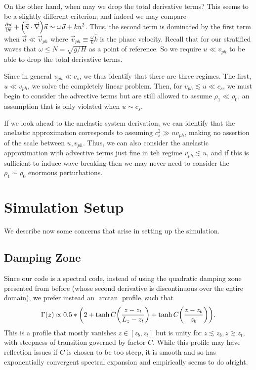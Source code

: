 \documentclass[11pt,
        usenames, %
        dvipsnames %
    ]{report}
\newcommand*{\pd}[2]{\frac{\partial#1}{\partial#2}}
\DeclarePairedDelimiter\p{\lparen}{\rparen}
\begin{document}
On the other hand, when may we drop the total derivative terms? This seems to be
a slightly different criterion, and indeed we may compare $\pd{\vec{u}}{t} +
\p*{\vec{u} \cdot \vec{\nabla}} \vec{u} \sim \omega \vec{u} + ku^2$. Thus, the
second term is dominated by the first term when $\vec{u} \ll \vec{v}_{ph}$ where
$\vec{v}_{ph} \equiv \frac{\omega}{k}\hat{k}$ is the phase velocity. Recall that
for our stratified waves that $\omega \leq N = \sqrt{g/H}$ as a point of
reference. So we require $u \ll v_{ph}$ to be able to drop the total derivative
terms.

Since in general $v_{ph} \ll c_s$, we thus identify that there are three
regimes. The first, $u \ll v_{ph}$, we solve the completely linear problem.
Then, for $v_{ph} \lesssim u \ll c_s$, we must begin to consider the advective
terms but are still allowed to assume $\rho_1 \ll \rho_0$, an assumption that is
only violated when $u \sim c_s$.

If we look ahead to the anelastic system derivation, we can identify that the
anelastic approximation corresponds to assuming $c_s^2 \gg uv_{ph}$, making no
assertion of the scale between $u, v_{ph}$. Thus, we can also consider the
anelastic approximation with advective terms just fine in teh regime $v_{ph}
\lesssim u$, and if this is sufficient to induce wave breaking then we may never
need to consider the $\rho_1 \sim \rho_0$ enormous perturbations.

\chapter{Simulation Setup}

We describe now some concerns that arise in setting up the simulation.

\section{Damping Zone}

Since our code is a spectral code, instead of using the quadratic damping zone
presented from before (whose second derivative is discontinuous over the entire
domain), we prefer instead an $\arctan$ profile, such that
\begin{equation}
    \Gamma(z) \propto 0.5 * \p*{
        2 + \tanh C\p*{\frac{z - z_t}{L_z - z_t}}
            + \tanh C\p*{\frac{z - z_b}{z_b}}}.
\end{equation}
This is a profile that mostly vanishes $z \in [z_b, z_t]$ but is unity for $z
\lesssim z_b, z \gtrsim z_t$, with steepness of transition governed by factor
$C$. While this profile may have reflection issues if $C$ is chosen to be too
steep, it is smooth and so has exponentially convergent spectral expansion and
empirically seems to do alright.
\end{document}
